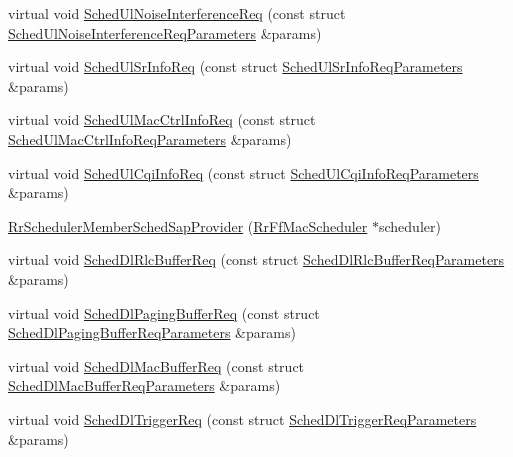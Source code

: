 \begin{DoxyCompactItemize}
virtual void \hyperlink{classns3_1_1RrSchedulerMemberSchedSapProvider_a9a4ffc73d68022ccbab9e7949c3b71ad}{Sched\+Ul\+Noise\+Interference\+Req} (const struct \hyperlink{structns3_1_1FfMacSchedSapProvider_1_1SchedUlNoiseInterferenceReqParameters}{Sched\+Ul\+Noise\+Interference\+Req\+Parameters} \&params)
\item 
virtual void \hyperlink{classns3_1_1RrSchedulerMemberSchedSapProvider_a22d12d9478a7a1a1c96408275e47662a}{Sched\+Ul\+Sr\+Info\+Req} (const struct \hyperlink{structns3_1_1FfMacSchedSapProvider_1_1SchedUlSrInfoReqParameters}{Sched\+Ul\+Sr\+Info\+Req\+Parameters} \&params)
\item 
virtual void \hyperlink{classns3_1_1RrSchedulerMemberSchedSapProvider_aaf5782c7b7a6dd91e164e4879342e030}{Sched\+Ul\+Mac\+Ctrl\+Info\+Req} (const struct \hyperlink{structns3_1_1FfMacSchedSapProvider_1_1SchedUlMacCtrlInfoReqParameters}{Sched\+Ul\+Mac\+Ctrl\+Info\+Req\+Parameters} \&params)
\item 
virtual void \hyperlink{classns3_1_1RrSchedulerMemberSchedSapProvider_a1c43264833291808bbc8e50f57531dad}{Sched\+Ul\+Cqi\+Info\+Req} (const struct \hyperlink{structns3_1_1FfMacSchedSapProvider_1_1SchedUlCqiInfoReqParameters}{Sched\+Ul\+Cqi\+Info\+Req\+Parameters} \&params)
\item 
\hyperlink{classns3_1_1RrSchedulerMemberSchedSapProvider_a3077e2378535150998298f8e20be0cee}{Rr\+Scheduler\+Member\+Sched\+Sap\+Provider} (\hyperlink{classns3_1_1RrFfMacScheduler}{Rr\+Ff\+Mac\+Scheduler} $\ast$scheduler)
\item 
virtual void \hyperlink{classns3_1_1RrSchedulerMemberSchedSapProvider_a3f5116bca261f1051201c196d188bd7b}{Sched\+Dl\+Rlc\+Buffer\+Req} (const struct \hyperlink{structns3_1_1FfMacSchedSapProvider_1_1SchedDlRlcBufferReqParameters}{Sched\+Dl\+Rlc\+Buffer\+Req\+Parameters} \&params)
\item 
virtual void \hyperlink{classns3_1_1RrSchedulerMemberSchedSapProvider_a6804b8f3b7d0006567782452d92c2606}{Sched\+Dl\+Paging\+Buffer\+Req} (const struct \hyperlink{structns3_1_1FfMacSchedSapProvider_1_1SchedDlPagingBufferReqParameters}{Sched\+Dl\+Paging\+Buffer\+Req\+Parameters} \&params)
\item 
virtual void \hyperlink{classns3_1_1RrSchedulerMemberSchedSapProvider_a5f9805e635c8744f9750eb44acf37f2a}{Sched\+Dl\+Mac\+Buffer\+Req} (const struct \hyperlink{structns3_1_1FfMacSchedSapProvider_1_1SchedDlMacBufferReqParameters}{Sched\+Dl\+Mac\+Buffer\+Req\+Parameters} \&params)
\item 
virtual void \hyperlink{classns3_1_1RrSchedulerMemberSchedSapProvider_a0805080225c03a56184ca1f6beafb96e}{Sched\+Dl\+Trigger\+Req} (const struct \hyperlink{structns3_1_1FfMacSchedSapProvider_1_1SchedDlTriggerReqParameters}{Sched\+Dl\+Trigger\+Req\+Parameters} \&params)

\end{DoxyCompactItemize}
